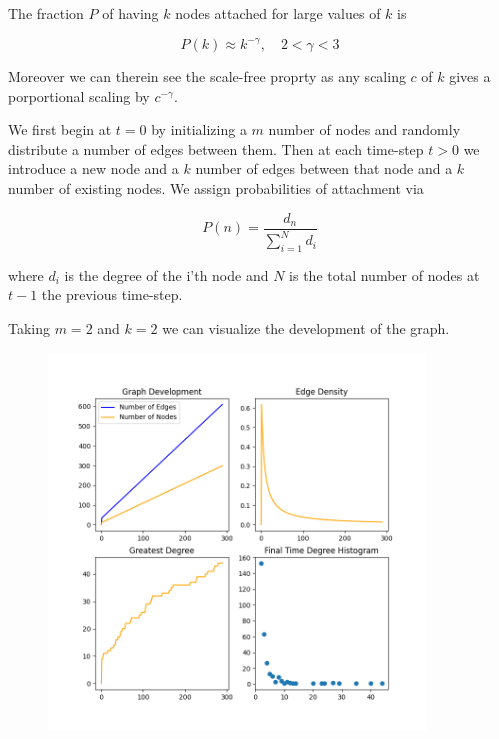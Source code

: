 The fraction $P$ of having $k$ nodes attached for large values of $k$ is 

$$
P(k) \approx k^{-\gamma} , \quad 2< \gamma <3
$$

Moreover we can therein see the scale-free proprty as any scaling $c$ of $k$ gives a porportional scaling
by $c^{-\gamma}$.

We first begin at $t=0$ by initializing a $m$ number of nodes and randomly distribute a number of edges between them.
Then at each time-step $t > 0$ we introduce a new node and a $k$ number of edges between that node 
and a $k$ number of existing nodes. We assign probabilities of attachment via 

$$
P(n) = \frac{d_n}{\sum^{N}_{i=1} d_i}
$$

where $d_i$ is the degree of the i'th node and $N$ is the total number of nodes at $t-1$ the previous time-step.


Taking $m=2$ and $k=2$ we can visualize the development of the graph.

\begin{figure}[h!]
    \includegraphics[width=10cm]{Images/graph_stats_pref_attach_10_2_300-210118-163357.png}
    \centering
\end{figure}

